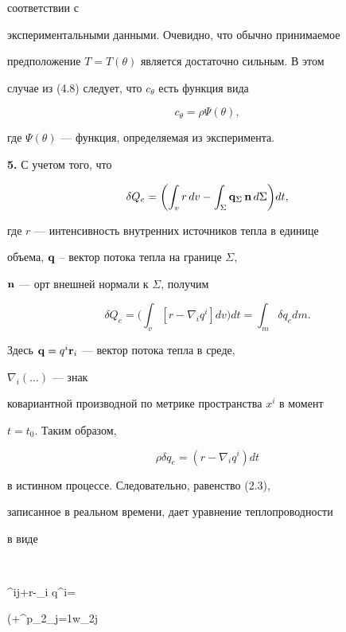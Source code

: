 соответствии с


экспериментальными данными. Очевидно, что обычно принимаемое


предположение $T=T(\theta)$ является достаточно сильным. В этом


случае из (4.8) следует, что $c_\theta$ есть функция вида


$$


c_\theta=\rho \Psi(\theta),


$$


где $\Psi(\theta)$ --- функция, определяемая из эксперимента.


\medskip





{\bf 5.} С учетом того, что


$$


\delta Q_e=\biggl(\int_vr\,dv-\int_\Sigma{\bold q}_\Sigma\,


{\bold n}\,d\Sigma \biggr)dt,


$$


где $r$ --- интенсивность внутренних источников тепла в единице


объема, $\bold q$ -- вектор потока тепла на границе $\Sigma$,


$\bold n$ --- орт внешней нормали к $\Sigma$, получим


$$


\delta Q_e=\biggl(\int_v[r-\nabla_i q^i]dv\biggr)dt=


\int_m \delta q_e dm.


$$


Здесь ${\bold q}=q^i{\bold r}_i$ --- вектор потока тепла в среде,


$\nabla_i(\dots)$ --- знак


ковариантной производной по метрике пространства $x^i$ в момент


$t=t_0$. Таким образом,


$$


\rho  \delta q_e=(r-\nabla_i q^i)dt


$$


в истинном процессе. Следовательно, равенство (2.3),


записанное в реальном времени, дает уравнение теплопроводности


в виде


$$


\tau^{ij}+r-\nabla_i q^i=


\rho \biggl(+\sum^{p_2}_{j=1}w_{2j}


